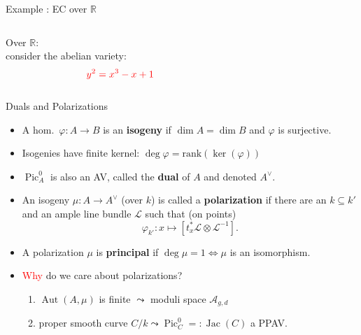 \documentclass[usenames,dvipsnames]{beamer}
\def\R{\mathbb{R}}
\DeclareMathOperator{\Pic}{Pic}
\DeclareMathOperator{\Aut}{Aut}
\DeclareMathOperator{\Jac}{Jac}
\newcommand{\vphi}{\varphi}
\newcommand{\red}[1]{\textcolor{red}{#1}}
\newcommand{\blue}[1]{\textcolor{blue}{#1}}
\begin{document}
\begin{frame}{ Example : EC over $\R$ }
\vspace{-0.5cm}
\begin{center}
	\begin{columns}
		\begin{column}{0.4\textwidth}
			\onslide<2-> {Over $\R$:\\ 
			consider the abelian variety: 
			\[ \red{y^2 = x^3 -x +1} \]}
			\onslide<3->{Addition law: $P,Q$ {\Large \blue{$\leadsto$}} $P\oplus Q$}
		\end{column}
		\begin{column}{0.5\textwidth}
		\end{column}
	\end{columns}
\end{center}
\end{frame}

\begin{frame}{ Duals and Polarizations }
    \begin{itemize}
     \item A hom.~$\vphi:A\to B$ is an {\bf isogeny} if $\dim A = \dim B$ and $\vphi$ is surjective.
     \pause \item Isogenies have finite kernel:  $\deg\vphi = \mathrm{rank}(\ker(\vphi))$
	 \pause \item $\Pic^0_{A}$ is also an AV, called the {\bf dual} of $A$ and denoted $A^\vee$.	 
	 \pause \item An isogeny $\mu:A\to A^\vee$ (over $k$) is called a {\bf polarization} if 
     there are an $k\subseteq k'$ and an ample line bundle $\mathcal{L}$ such that (on points)
     \[ \vphi_{k'}: x\mapsto [t_x^*\mathcal{L} \otimes\mathcal{L}^{-1} ]. \]
     \vspace{-1.5em}
	 \pause \item A polarization $\mu$ is {\bf principal} if $\deg \mu = 1 \iff \mu$ is an isomorphism.
	 \pause \item \red{Why} do we care about polarizations?
        \begin{enumerate}
    	 \pause \item $\Aut(A,\mu)$ is finite $\leadsto$ moduli space $\mathcal{A}_{g,d}$
    	 \pause \item proper smooth curve $C/k \leadsto \Pic^0_{C}=:\Jac(C)$ a PPAV.
    	\end{enumerate}
	\end{itemize}
\end{frame}
\end{document}
